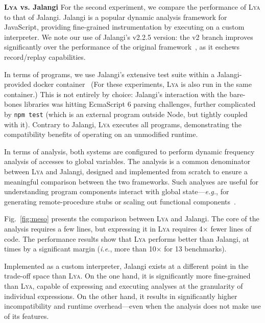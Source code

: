 \documentclass[letterpaper,twocolumn,10pt]{article}
\def\eg{{\em e.g.}, }
\def\ie{{\em i.e.}, }
\newcommand{\heading}[1]{\vspace{2pt}\noindent\textbf{#1}\enspace}
\newcommand{\ttt}[1]{\texttt{#1}}
\newcommand{\sys}{{\scshape Lya}\xspace}
\begin{document}
\heading{\sys vs. Jalangi}
For the second experiment, we compare the performance of \sys to that of Jalangi.
Jalangi is a popular dynamic analysis framework for JavaScript, providing fine-grained instrumentation by executing on a custom interpreter.
We note our use of Jalangi's v2.2.5 version:
  the v2 branch improves significantly over the performance of the original framework~\cite{jalangi}, as it eschews record/replay capabilities.

In terms of programs, we use Jalangi's extensive test suite within a Jalangi-provided docker container~\cite{jaladocker}
(For these experiments, \sys is also run in the same container.)
This is not entirely by choice:
  Jalangi's interaction with the bare-bones libraries was hitting EcmaScript 6 parsing challenges, further complicated by \ttt{npm test} (which is an external program outside Node, but tightly coupled with it).
Contrary to Jalangi, \sys executes all programs, demonstrating the compatibility benefits of operating on an unmodified runtime.


In terms of analysis, both systems are configured to perform dynamic frequency analysis of accesses to global variables.
The analysis is a common denominator between \sys and Jalangi, designed and implemented from scratch to ensure a %
  meaningful comparison between the two frameworks.
Such analyses are useful for understanding program components interact with global state---\eg for generating remote-procedure stubs or scaling out functional components~\cite{ignis}.

Fig.~\ref{fig:meso} presents the comparison between \sys and Jalangi.
The core of the analysis requires a few lines, but expressing it in \sys requires 4$\times$ fewer lines of code.
The performance results show that \sys performs better than Jalangi, at times by a significant margin (\ie more than 10$\times$ for 13 benchmarks).

Implemented as a custom interpreter, Jalangi exists at a different point in the trade-off space than \sys.
On the one hand, it is significantly more fine-grained than \sys, capable of expressing and executing analyses at the granularity of individual expressions.
On the other hand, it results in significantly higher incompatibility and runtime overhead---even when the analysis does not make use of its features.
\end{document}
